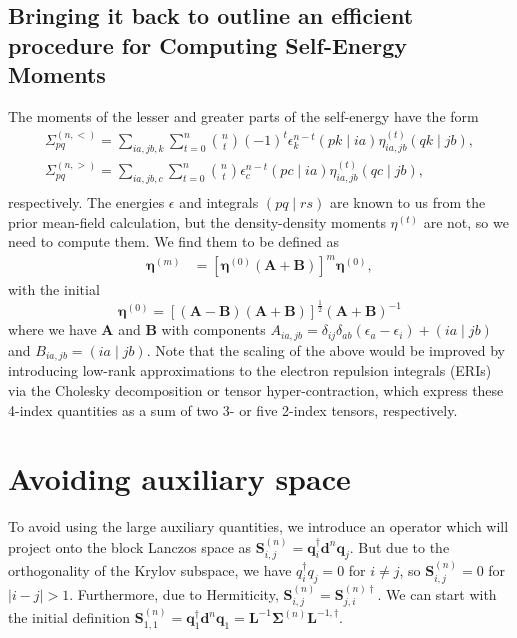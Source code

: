 \subsection{Bringing it back to outline an efficient procedure for Computing Self-Energy Moments}
\label{sec:self_energy_moments}
The moments of the lesser and greater parts of the self-energy have the form
\begin{equation}
\begin{gathered}
\Sigma_{pq}^{(n,<)}=\sum_{ia, jb, k} \sum_{t=0}^n\binom{n}{t}(-1)^t \epsilon_k^{n-t}(pk \mid ia) \eta_{ia, jb}^{(t)}(qk \mid jb), \\
\Sigma_{pq}^{(n,>)}=\sum_{ia, jb, c} \sum_{t=0}^n\binom{n}{t} \epsilon_c^{n-t}(pc \mid ia) \eta_{ia, jb}^{(t)}(qc \mid jb),\\
\end{gathered}
\end{equation}
respectively. The energies $\epsilon$ and integrals $(pq \mid rs)$ are known to us from the prior mean-field calculation, but the density-density moments $\eta^{(t)}$ are not, so we need to compute them. We find them to be defined as
\begin{equation}
\begin{aligned}
\boldsymbol{\eta}^{(m)} 
& =\left[\boldsymbol{\eta}^{(0)}(\mathbf{A}+\mathbf{B})\right]^m \boldsymbol{\eta}^{(0)} ,
\end{aligned}
\end{equation}
with the initial
\begin{equation}
\boldsymbol{\eta}^{(0)}=[(\mathbf{A}-\mathbf{B})(\mathbf{A}+\mathbf{B})]^{\frac{1}{2}}(\mathbf{A}+\mathbf{B})^{-1} 
\end{equation}
where we have $\mathbf{A}$ and $\mathbf{B}$ with components $A_{ia,jb}=\delta_{ij}\delta_{ab}\left(\epsilon_a - \epsilon_i\right)+(ia \mid jb)$ and $B_{ia,jb}=(ia \mid jb)$.
Note that the scaling of the above would be improved by introducing low-rank approximations to the electron repulsion integrals (ERIs) via the Cholesky decomposition or tensor hyper-contraction, which express these 4-index quantities as a sum of two 3- or five 2-index tensors, respectively.
\section{Avoiding auxiliary space}
To avoid using the large auxiliary quantities, we introduce an operator which will project onto the block Lanczos space as $\mathbf{S}_{i,j}^{(n)} =\mathbf{q}_i^{\dagger} \mathbf{d}^n \mathbf{q}_j$. But due to the orthogonality of the Krylov subspace, we have $q_i^\dagger q_j = 0$ for $i\neq j$, so $\mathbf{S}_{i,j}^{(n)} = 0$ for $|i-j|>1$. Furthermore, due to Hermiticity, $\mathbf{S}_{i,j}^{(n)} = \mathbf{S}_{j,i}^{(n) \dagger}$. We can start with the initial definition $\mathbf{S}_{1,1}^{(n)} = \mathbf{q}_1^\dagger \mathbf{d}^n \mathbf{q}_1 = \mathbf{L}^{-1} \mathbf{\Sigma}^{(n)} \mathbf{L}^{-1, \dagger}$.

